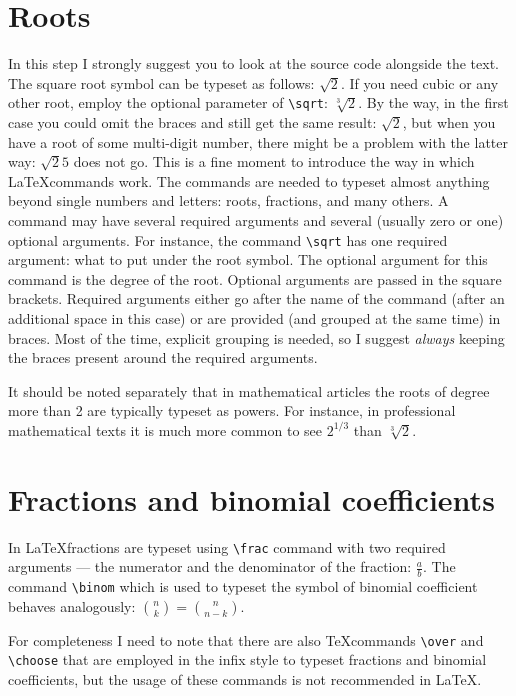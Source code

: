 \section{Roots}
\par In this step I strongly suggest you to look at the source code alongside the text. The square root symbol can be typeset as follows: \( \sqrt{2} \). If you need cubic or any other root, employ the optional parameter of \verb"\sqrt": \( \sqrt[3]{2} \). By the way, in the first case you could omit the braces and still get the same result: \( \sqrt 2 \), but when you have a root of some multi-digit number, there might be a problem with the latter way: \( \sqrt 25 \) does not go. This is a fine moment to introduce the way in which \LaTeX commands work. The commands are needed to typeset almost anything beyond single numbers and letters: roots, fractions, and many others. A command may have several required arguments and several (usually zero or one) optional arguments. For instance, the command \verb"\sqrt" has one required argument: what to put under the root symbol. The optional argument for this command is the degree of the root. Optional arguments are passed in the square brackets. Required arguments either go after the name of the command (after an additional space in this case) or are provided (and grouped at the same time) in braces. Most of the time, explicit grouping is needed, so I suggest \emph{always} keeping the braces present around the required arguments.
\par It should be noted separately that in mathematical articles the roots of degree more than 2 are typically typeset as powers. For instance, in professional mathematical texts it is much more common to see \( 2^{1/3} \) than \( \sqrt[3]{2} \).

\section{Fractions and binomial coefficients}
\par In \LaTeX fractions are typeset using \verb"\frac" command with two required arguments --- the numerator and the denominator of the fraction: \( \frac{a}{b} \). The command \verb"\binom" which is used to typeset the symbol of binomial coefficient behaves analogously: \( \binom{n}{k} = \binom{n}{n-k} \).
\par For completeness I need to note that there are also \TeX commands \verb"\over" and \verb"\choose" that are employed in the infix style to typeset fractions and binomial coefficients, but the usage of these commands is not recommended in \LaTeX.

